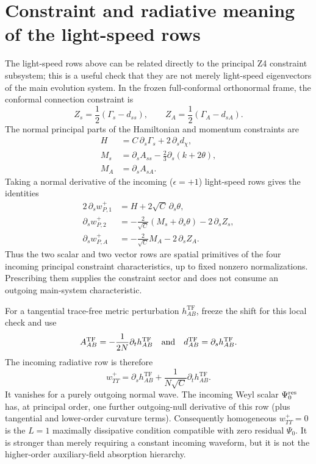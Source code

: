 \documentclass[11pt]{article}
\newcommand{\tf}{\mathrm{TF}}
\begin{document}
\section{Constraint and radiative meaning of the light-speed rows}

The light-speed rows above can be related directly to the principal Z4
constraint subsystem; this is a useful check that they are not merely
light-speed eigenvectors of the main evolution system.  In the frozen
full-conformal orthonormal frame, the conformal connection constraint is
\[
 Z_s=\frac12(\Gamma_s-d_{ss}),\qquad
 Z_A=\frac12(\Gamma_A-d_{sA}).
\]
The normal principal parts of the Hamiltonian and momentum constraints are
\begin{align}
 H&=C\,\partial_s\Gamma_s+2\,\partial_s d_\chi,\\
 M_s&=\partial_s A_{ss}
      -\frac23\partial_s(k+2\theta),\\
 M_A&=\partial_s A_{sA}.
\end{align}
Taking a normal derivative of the incoming (\(\epsilon=+1\)) light-speed
rows gives the identities
\begin{align}
 2\,\partial_s w_{P,1}^{+}
   &=H+2\sqrt C\,\partial_s\theta,\\
 \partial_s w_{P,2}^{+}
   &=-\frac{2}{\sqrt C}\left(M_s+\partial_s\theta\right)
     -2\,\partial_s Z_s,\\
 \partial_s w_{P,A}^{+}
   &=-\frac{2}{\sqrt C}M_A-2\,\partial_s Z_A.
\end{align}
Thus the two scalar and two vector rows are spatial primitives of the four
incoming principal constraint characteristics, up to fixed nonzero
normalizations.  Prescribing them supplies the constraint sector and does
not consume an outgoing main-system characteristic.

For a tangential trace-free metric perturbation \(h_{AB}^{\tf}\), freeze the
shift for this local check and use
\[
 A_{AB}^{\tf}=-\frac{1}{2N}\partial_t h_{AB}^{\tf}
 \quad\hbox{and}\quad
 d_{AB}^{\tf}=\partial_s h_{AB}^{\tf}.
\]
The incoming radiative row is therefore
\[
 w_{TT}^{+}
 =\partial_s h_{AB}^{\tf}
  +\frac{1}{N\sqrt C}\partial_t h_{AB}^{\tf}.
\]
It vanishes for a purely outgoing normal wave.  The incoming Weyl scalar
\(\Psi_0^{\rm res}\) has, at principal order, one further outgoing-null
derivative of this row (plus tangential and lower-order curvature terms).
Consequently homogeneous \(w_{TT}^{+}=0\) is the \(L=1\) maximally
dissipative condition compatible with zero residual \(\Psi_0\).  It is
stronger than merely requiring a constant incoming waveform, but it is not
the higher-order auxiliary-field absorption hierarchy.
\end{document}
